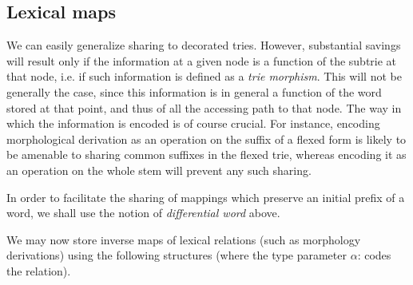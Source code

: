 \subsection{Lexical maps}

We can easily generalize sharing to decorated tries. However,
substantial savings will result only if the information at a given node
is a function of the subtrie at that node, i.e. if such information is
defined as a {\sl trie morphism}. This will not be generally the case,
since this information is in general a function of the word stored at
that point, and thus of all the accessing path to that node. The way in which
the information is encoded is of course crucial. For instance, encoding
morphological derivation as an operation on the suffix of a flexed form
is likely to be amenable to sharing common suffixes in the flexed trie,
whereas encoding it as an operation on the whole stem will prevent any 
such sharing. 

In order to facilitate the sharing of mappings which preserve an initial
prefix of a word, we shall use the notion of {\sl differential word} above.

We may now store inverse maps of lexical relations (such as morphology
derivations) using the following structures 
(where the type parameter $\alpha$: codes the relation).

